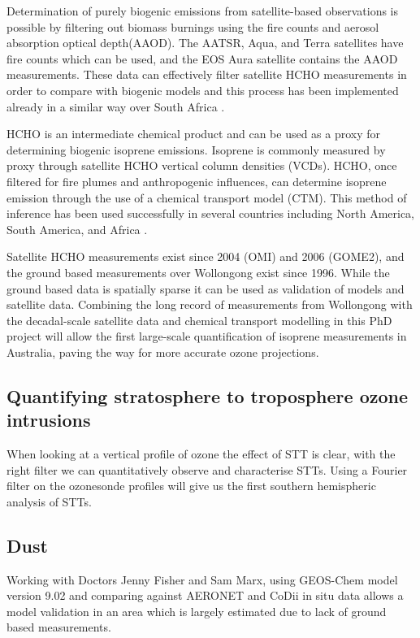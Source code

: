 Determination of purely biogenic emissions from satellite-based observations is possible by filtering out biomass burnings using the fire counts and aerosol absorption optical depth(AAOD). The AATSR, Aqua, and Terra satellites have fire counts which can be used, and the EOS Aura satellite contains the AAOD measurements. These data can effectively filter satellite HCHO measurements in order to compare with biogenic models and this process has been implemented already in a similar way over South Africa \cite{Marais_2012}.

HCHO is an intermediate chemical product and can be used as a proxy for determining biogenic isoprene emissions. 
Isoprene is commonly measured by proxy through satellite HCHO vertical column densities (VCDs). HCHO, once filtered for fire plumes and anthropogenic influences, can determine isoprene emission through the use of a chemical transport model (CTM).
This method of inference has been used successfully in several countries including North America\cite{Palmer_2003}, South America\cite{Barkley_2013}, and Africa \cite{Marais_2012}.

Satellite HCHO measurements exist since 2004 (OMI) and 2006 (GOME2), and the ground based measurements over Wollongong exist since 1996. While the ground based data is spatially sparse it can be used as validation of models and satellite data. Combining the long record of measurements from Wollongong with the decadal-scale satellite data and chemical transport modelling in this PhD project will allow the first large-scale quantification of isoprene measurements in Australia, paving the way for more accurate ozone projections.

\subsection{Quantifying stratosphere to troposphere ozone intrusions}
When looking at a vertical profile of ozone the effect of STT is clear, with the right filter we can quantitatively observe and characterise STTs.
Using a Fourier filter on the ozonesonde profiles will give us the first southern hemispheric analysis of STTs.

\subsection{Dust}
Working with Doctors Jenny Fisher and Sam Marx, using GEOS-Chem model version 9.02 and comparing against AERONET and CoDii in situ data allows a model validation in an area which is largely estimated due to lack of ground based measurements.

